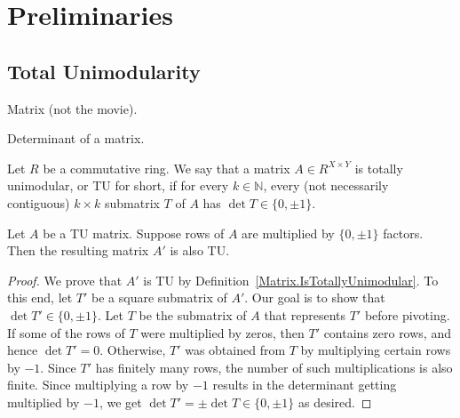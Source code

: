 \chapter{Preliminaries}

\section{Total Unimodularity}

\begin{definition}
    \label{Matrix}
    \leanok
    Matrix (not the movie).
\end{definition}

\begin{definition}
    \label{Matrix.det}
    \leanok
    Determinant of a matrix.
\end{definition}

\begin{definition}
    \label{Matrix.IsTotallyUnimodular}
    \leanok
    Let $R$ be a commutative ring. We say that a matrix $A \in R^{X \times Y}$ is totally unimodular, or TU for short, if for every $k \in \mathbb{N}$, every (not necessarily contiguous) $k \times k$ submatrix $T$ of $A$ has $\det T \in \{0, \pm 1\}$.
\end{definition}

\begin{lemma}
    \label{Matrix.IsTotallyUnimodular.mul_rows}
    \leanok
    Let $A$ be a TU matrix. Suppose rows of $A$ are multiplied by $\{0, \pm 1\}$ factors. Then the resulting matrix $A'$ is also TU.
\end{lemma}

\begin{proof}
    \leanok
    We prove that $A'$ is TU by Definition~\ref{Matrix.IsTotallyUnimodular}. To this end, let $T'$ be a square submatrix of $A'$. Our goal is to show that $\det T' \in \{0, \pm 1\}$. Let $T$ be the submatrix of $A$ that represents $T'$ before pivoting. If some of the rows of $T$ were multiplied by zeros, then $T'$ contains zero rows, and hence $\det T' = 0$. Otherwise, $T'$ was obtained from $T$ by multiplying certain rows by $-1$. Since $T'$ has finitely many rows, the number of such multiplications is also finite. Since multiplying a row by $-1$ results in the determinant getting multiplied by $-1$, we get $\det T' = \pm \det T \in \{0, \pm 1\}$ as desired.
\end{proof}

